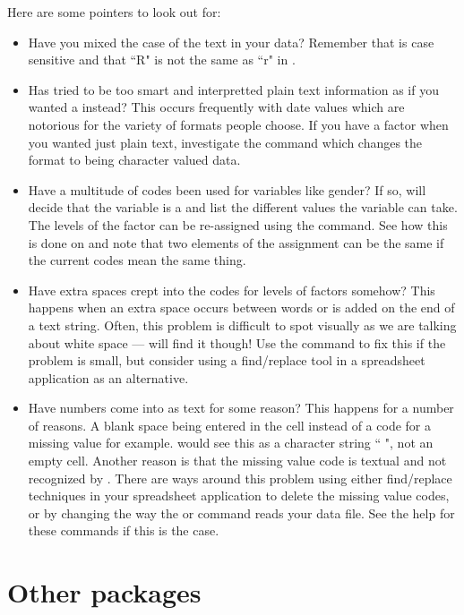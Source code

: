 Here are some pointers to look out for:\begin{itemize} 
 
\item Have you mixed the case of the text in your data? Remember that \R{} is case sensitive and that ``R" is not the same as ``r" in \R{}. 
 
\item Has \R{} tried to be too smart and interpretted plain text information as if you wanted a  instead? This occurs frequently with date values which are notorious for the variety of formats people choose. If you have a factor when you wanted just plain text, investigate the  command which changes the format to being character valued data. 
\item Have a multitude of codes been used for variables like gender? If so, \R{} will decide that the variable is a  and list the different values the variable can take. The levels of the factor can be re-assigned using the  command. See how this is done on \pageref{UseOfLevels} and note that two elements of the assignment can be the same if the current codes mean the same thing. 
\item Have extra spaces crept into the codes for levels of factors somehow? This happens when an extra space occurs between words or is added on the end of a text string. Often, this problem is difficult to spot visually as we are talking about white space --- \R{} will find it though! Use the  command to fix this if the problem is small, but consider using a find/replace tool in a spreadsheet application as an alternative. 
\item Have numbers come into \R{} as text for some reason? This happens for a number of reasons. A blank space being entered in the cell instead of a code for a missing value for example. \R{} would see this as a character string `` ", not an empty cell. Another reason is that the missing value code is textual and not recognized by \R{}. There are ways around this problem using either find/replace techniques in your spreadsheet application to delete the missing value codes, or by changing the way the  or  command reads your data file. See the help for these commands if this is the case. 
\end{itemize} 
 
\section{Other packages} 

